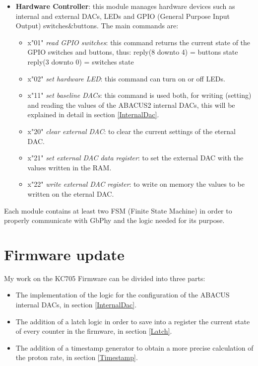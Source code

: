 \begin{itemize}
	\item \textbf{Hardware Controller}: this module manages hardware devices such as internal and external DACs, LEDs and GPIO (General Purpose Input Output) switches\&buttons. The main commands are:
	\begin{itemize}
		\item x"01" \textit{read GPIO switches}: this command returns the current state of the GPIO switches and buttons, thus:
		\newline
		reply(8 downto 4) = buttons state
		\newline
		reply(3 downto 0) = switches state
		\item x"02" \textit{set hardware LED}: this command can turn on or off LEDs.
		\item x"11" \textit{set baseline DACs}: this command is used both, for writing (setting) and reading the values of the ABACUS2 internal DACs, this will be explained in detail in section \ref{InternalDac}.
		\item x"20" \textit{clear external DAC}: to clear the current settings of the eternal DAC. 
		\item x"21" \textit{set external DAC data register}: to set the external DAC with the values written in the RAM.
		\item x"22" \textit{write external DAC register}: to write on memory the values to be written on the eternal DAC.
	\end{itemize}  
		
\end{itemize}
\noindent Each module contains at least two FSM (Finite State Machine) in order to properly communicate with GbPhy and the logic needed for its purpose. 

\section{Firmware update}
My work on the KC705 Firmware can be divided into three parts:
\begin{itemize}
	\item The implementation of the logic for the configuration of the ABACUS internal DACs, in section \ref{InternalDac}. 
	\item The addition of a latch logic in order to save into a register the current state of every counter in the firmware, in section \ref{Latch}.
	\item The addition of a timestamp generator to obtain a more precise calculation of the proton rate, in section \ref{Timestamp}. 
\end{itemize}

